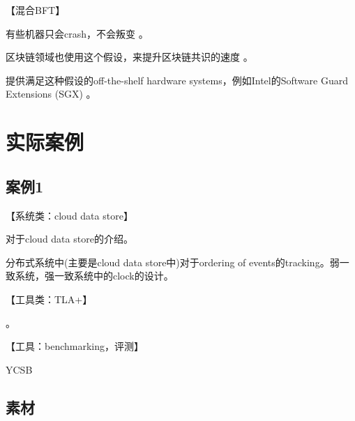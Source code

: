 \documentclass[UTF8]{ctexrep}
\newcommand{\mybreak}{\vspace{1cm}}
\begin{document}
\mybreak

【混合BFT】

有些机器只会crash，不会叛变 \cite{Vukotic19}。

区块链领域也使用这个假设，来提升区块链共识的速度 \cite{Dang19}。

提供满足这种假设的off-the-shelf hardware systems，例如Intel的Software Guard Extensions (SGX) \cite{McKeen13}。


\part{实际案例}


\chapter{案例1}

【系统类：cloud data store】

\cite{Bravo15}

对于cloud data store的介绍。

分布式系统中(主要是cloud data store中)对于ordering of events的tracking。弱一致系统，强一致系统中的clock的设计。


\mybreak

【工具类：TLA+】


\cite{TLA-Github}。


\mybreak

【工具：benchmarking，评测】

YCSB \cite{Cooper10, YCSB-Github}



\chapter*{素材}















%
%




\end{document}
